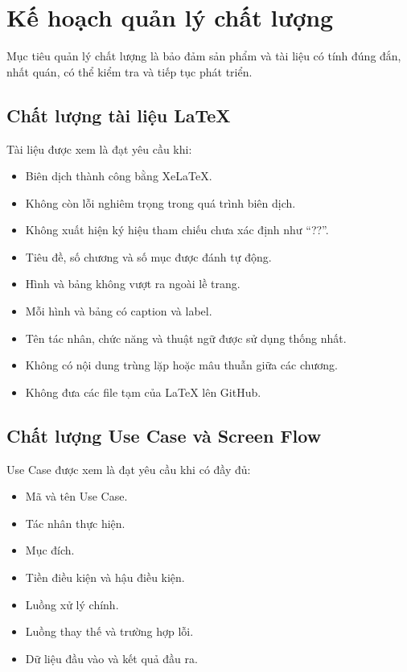\section{Kế hoạch quản lý chất lượng}

Mục tiêu quản lý chất lượng là bảo đảm sản phẩm và tài liệu có tính đúng
đắn, nhất quán, có thể kiểm tra và tiếp tục phát triển.

\subsection{Chất lượng tài liệu LaTeX}

Tài liệu được xem là đạt yêu cầu khi:

\begin{itemize}
	\item Biên dịch thành công bằng XeLaTeX.
	\item Không còn lỗi nghiêm trọng trong quá trình biên dịch.
	\item Không xuất hiện ký hiệu tham chiếu chưa xác định như ``??''.
	\item Tiêu đề, số chương và số mục được đánh tự động.
	\item Hình và bảng không vượt ra ngoài lề trang.
	\item Mỗi hình và bảng có caption và label.
	\item Tên tác nhân, chức năng và thuật ngữ được sử dụng thống nhất.
	\item Không có nội dung trùng lặp hoặc mâu thuẫn giữa các chương.
	\item Không đưa các file tạm của LaTeX lên GitHub.
\end{itemize}

\subsection{Chất lượng Use Case và Screen Flow}

Use Case được xem là đạt yêu cầu khi có đầy đủ:

\begin{itemize}
	\item Mã và tên Use Case.
	\item Tác nhân thực hiện.
	\item Mục đích.
	\item Tiền điều kiện và hậu điều kiện.
	\item Luồng xử lý chính.
	\item Luồng thay thế và trường hợp lỗi.
	\item Dữ liệu đầu vào và kết quả đầu ra.
\end{itemize}

